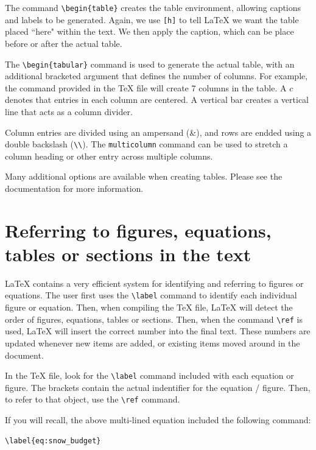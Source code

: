 \documentclass[master]{UWMThesis}
\begin{document}
The command \verb=\begin{table}= creates the table environment, allowing captions and labels to be generated.  Again, we use \verb=[h]= to tell LaTeX we want the table placed ``here" within the text.  We then apply the caption, which can be place before or after the actual table. 

The \verb=\begin{tabular}= command is used to generate the actual table, with an additional bracketed argument that defines the number of columns.  For example, the command provided in the TeX file will create 7 columns in the table.  A $c$ denotes that entries in each column are centered.  A vertical bar creates a vertical line that acts as a column divider.

Column entries are divided using an ampersand (\&), and rows are endded using a double backslash (\verb=\\=).  The \verb=multicolumn= command can be used to stretch a column heading or other entry across multiple columns.

Many additional options are available when creating tables.  Please see the documentation for more information.


\chapter{Referring to figures, equations, tables or sections in the text}
LaTeX contains a very efficient system for identifying and referring to figures or equations.  The user first uses the  \verb=\label= command to identify each individual figure or equation.  Then, when compiling the TeX file, LaTeX will detect the order of figures, equations, tables or sections.  Then, when the command \verb=\ref= is used, LaTeX will insert the correct number into the final text.  These numbers are updated whenever new items are added, or existing items moved around in the document.

In the TeX file, look for the \verb=\label= command included with each equation or figure.
The brackets contain the actual indentifier for the equation / figure.  Then, to refer to that object, use the \verb=\ref= command.

If you will recall, the above multi-lined equation included the following command:

\begin{verbatim}
\label{eq:snow_budget}
\end{verbatim}
\end{document}
